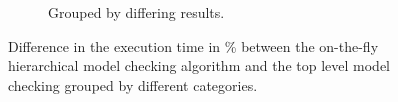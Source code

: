 \documentclass[a4paper, 12pt, twoside]{report}
\begin{document}
\begin{figure}
\begin{center}
\begin{subfigure}{0.45\textwidth}
\begin{center}
					\caption{Grouped by differing results.}\label{fig:bar_time_otf_hier}
				\end{center}
			\end{subfigure}	
			\caption{Difference in the execution time in \% between the on-the-fly hierarchical model checking algorithm and the top level model checking grouped by different categories.}\label{fig:time_otf}
		\end{center}
	\end{figure}
	
\end{document}
